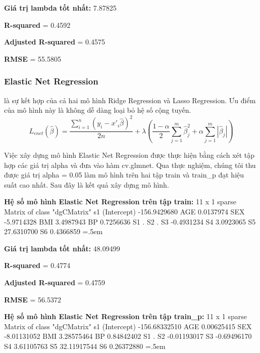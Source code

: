 \documentclass[runningheads]{llncs}
\newenvironment{lcverbatim}
 {\SaveVerbatim{cverb}}
 {\endSaveVerbatim
  \flushleft\fboxrule=0pt\fboxsep=.5em
  \colorbox{cverbbg}{%
    \makebox[\dimexpr\linewidth-2\fboxsep][l]{\BUseVerbatim{cverb}}%
  }
  \endflushleft
}
\begin{document}
\textbf{Giá trị lambda tốt nhất:} 7.87825

\textbf{R-squared} = 0.4592

\textbf{Adjusted R-squared} = 0.4575

\textbf{RMSE} = 55.5805

\subsubsection{Elastic Net Regression}
là sự kết hợp của cả hai mô hình Ridge Regression và Lasso Regression. Ưu điểm của mô hình này là không dễ dàng loại bỏ hệ số cộng tuyến.
	\begin{equation}
		L_{enet}(\hat{\beta})=\frac{\sum^{n}_{i=1}{(y_i-x'_i\hat{\beta})^2}}{2n}+\lambda(\frac{1-\alpha}{2}\sum^{m}_{j=1}{\hat{\beta}^2_j+\alpha\sum^{m}_{j=1}{|\hat{\beta}_j|}})
	\end{equation}

Việc xây dựng mô hình Elastic Net Regression được thực hiện bằng cách xét tập hợp các giá trị alpha và đưa vào hàm cv.glmnet. Qua thực nghiệm, chúng tôi thu được giá trị alpha = 0.05 làm mô hình trên hai tập train và train\_p đạt hiệu suất cao nhất. Sau đây là kết quả xây dựng mô hình.

\vspace{0.5cm}
\textbf{Hệ số mô hình Elastic Net Regression trên tập train:}
\begin{lcverbatim}
11 x 1 sparse Matrix of class "dgCMatrix"
                      s1
(Intercept) -156.9429680
AGE            0.0137974
SEX           -5.9714328
BMI            3.4987943
BP             0.7256636
S1             .        
S2             .        
S3            -0.4931234
S4             3.0923065
S5            27.6310700
S6             0.4366859
\end{lcverbatim}

\textbf{Giá trị lambda tốt nhất:} 48.09499

\textbf{R-squared} = 0.4774

\textbf{Adjusted R-squared} = 0.4759

\textbf{RMSE} = 56.5372

\vspace{0.5cm}
\textbf{Hệ số mô hình Elastic Net Regression trên tập train\_p:}
\begin{lcverbatim}
11 x 1 sparse Matrix of class "dgCMatrix"
                       s1
(Intercept) -156.68332510
AGE            0.00625415
SEX           -8.01131052
BMI            3.28575464
BP             0.84842402
S1             .         
S2            -0.01193017
S3            -0.69496170
S4             3.61105763
S5            32.11917544
S6             0.26372880
\end{lcverbatim}
\end{document}
